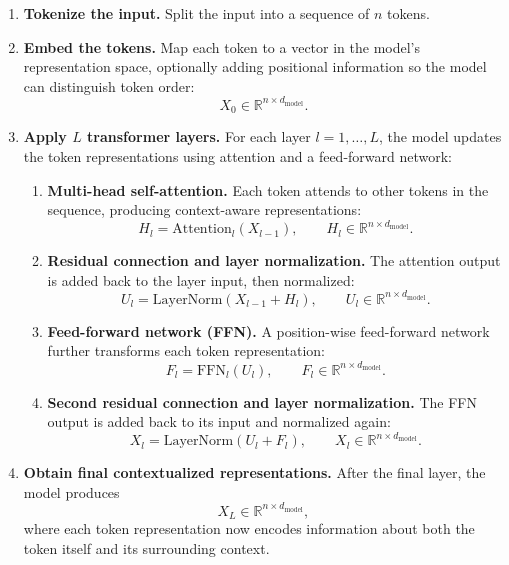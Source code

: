 \begin{enumerate}
    \item \textbf{Tokenize the input.}
    Split the input into a sequence of $n$ tokens.

    \item \textbf{Embed the tokens.}
    Map each token to a vector in the model's representation space, optionally adding positional information so the model can distinguish token order:
    \[
        X_0 \in \mathbb{R}^{n \times d_{\mathrm{model}}}.
    \]

    \item \textbf{Apply $L$ transformer layers.}
    For each layer $l = 1, \dots, L$, the model updates the token representations using attention and a feed-forward network:
    \begin{enumerate}
        \item \textbf{Multi-head self-attention.}
        Each token attends to other tokens in the sequence, producing context-aware representations:
        \[
            H_l = \mathrm{Attention}_l(X_{l-1}),
            \qquad
            H_l \in \mathbb{R}^{n \times d_{\mathrm{model}}}.
        \]

        \item \textbf{Residual connection and layer normalization.}
        The attention output is added back to the layer input, then normalized:
        \[
            U_l = \mathrm{LayerNorm}(X_{l-1} + H_l),
            \qquad
            U_l \in \mathbb{R}^{n \times d_{\mathrm{model}}}.
        \]

        \item \textbf{Feed-forward network (FFN).}
        A position-wise feed-forward network further transforms each token representation:
        \[
            F_l = \mathrm{FFN}_l(U_l),
            \qquad
            F_l \in \mathbb{R}^{n \times d_{\mathrm{model}}}.
        \]

        \item \textbf{Second residual connection and layer normalization.}
        The FFN output is added back to its input and normalized again:
        \[
            X_l = \mathrm{LayerNorm}(U_l + F_l),
            \qquad
            X_l \in \mathbb{R}^{n \times d_{\mathrm{model}}}.
        \]
    \end{enumerate}

    \item \textbf{Obtain final contextualized representations.}
    After the final layer, the model produces
    \[
        X_L \in \mathbb{R}^{n \times d_{\mathrm{model}}},
    \]
    where each token representation now encodes information about both the token itself and its surrounding context.


\end{enumerate}
